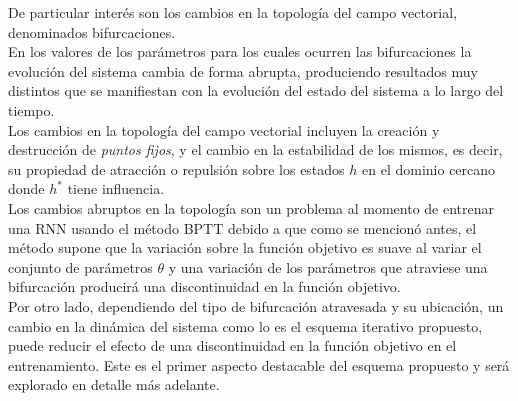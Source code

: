 \documentclass{article}
\begin{document}
	De particular interés son los cambios en la topología del campo vectorial, denominados bifurcaciones\cite{21StrogatzBook}.\\
	En los valores de los parámetros para los cuales ocurren las bifurcaciones la evolución del sistema cambia de forma abrupta, produciendo resultados muy distintos que se manifiestan con la evolución del estado del sistema a lo largo del tiempo.\\
	Los cambios en la topología del campo vectorial incluyen la creación y destrucción de \textit{puntos fijos}, y el cambio en la estabilidad de los mismos, es decir, su propiedad de atracción o repulsión sobre los estados $h$ en el dominio cercano donde $h^*$ tiene influencia.\\
	Los cambios abruptos en la topología son un problema al momento de entrenar una RNN usando el método BPTT debido a que como se mencionó antes, el método supone que la variación sobre la función objetivo es suave al variar el conjunto de parámetros $\theta$ y una variación de los parámetros que atraviese una bifurcación producirá una discontinuidad en la función objetivo\cite{10Pascanu}\cite{23BifurcationsDoya}.\\
	
	Por otro lado, dependiendo del tipo de bifurcación atravesada y su ubicación, un cambio en la dinámica del sistema como lo es el esquema iterativo propuesto, puede reducir el efecto de una discontinuidad en la función objetivo en el entrenamiento. Este es el primer aspecto destacable del esquema propuesto y será explorado en detalle más adelante.\\
	
\end{document}
